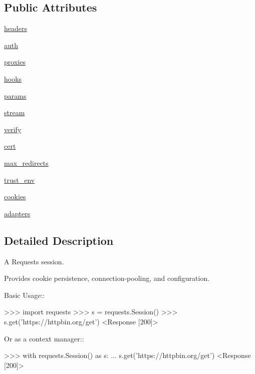 \subsection*{Public Attributes}
\begin{DoxyCompactItemize}
\item 
\hyperlink{classpip_1_1__vendor_1_1requests_1_1sessions_1_1Session_a260a167342ae13fa3250628c9224364c}{headers}
\item 
\hyperlink{classpip_1_1__vendor_1_1requests_1_1sessions_1_1Session_adc56ee363c5aa9771d07b94f4dbe4383}{auth}
\item 
\hyperlink{classpip_1_1__vendor_1_1requests_1_1sessions_1_1Session_ac1be9a4669d07d146c60ee9118f0d7da}{proxies}
\item 
\hyperlink{classpip_1_1__vendor_1_1requests_1_1sessions_1_1Session_ae9afe46aed89b72d37046c92982db003}{hooks}
\item 
\hyperlink{classpip_1_1__vendor_1_1requests_1_1sessions_1_1Session_af18ffa40a3a6d96caa694d37159c9dd3}{params}
\item 
\hyperlink{classpip_1_1__vendor_1_1requests_1_1sessions_1_1Session_a10665226c0b2c5be18e641d17cb06591}{stream}
\item 
\hyperlink{classpip_1_1__vendor_1_1requests_1_1sessions_1_1Session_a6f3eac9bc19bd50f242e8189c0b2fd45}{verify}
\item 
\hyperlink{classpip_1_1__vendor_1_1requests_1_1sessions_1_1Session_a20cd9cccb44cd8de5a626e4f99e468ef}{cert}
\item 
\hyperlink{classpip_1_1__vendor_1_1requests_1_1sessions_1_1Session_a6697a22302d6d472d82dd78abbb7ff33}{max\+\_\+redirects}
\item 
\hyperlink{classpip_1_1__vendor_1_1requests_1_1sessions_1_1Session_a213d81528eeb3ed29ebc59dff11e942b}{trust\+\_\+env}
\item 
\hyperlink{classpip_1_1__vendor_1_1requests_1_1sessions_1_1Session_a3996fdb2223c510c41f9a770e3962c4a}{cookies}
\item 
\hyperlink{classpip_1_1__vendor_1_1requests_1_1sessions_1_1Session_a680f6689083bbef15df51112e6ee1aa7}{adapters}
\end{DoxyCompactItemize}


\subsection{Detailed Description}
\begin{DoxyVerb}A Requests session.

Provides cookie persistence, connection-pooling, and configuration.

Basic Usage::

  >>> import requests
  >>> s = requests.Session()
  >>> s.get('https://httpbin.org/get')
  <Response [200]>

Or as a context manager::

  >>> with requests.Session() as s:
  ...     s.get('https://httpbin.org/get')
  <Response [200]>
\end{DoxyVerb}
 

